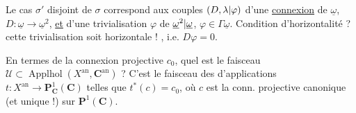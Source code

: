 Le cas $\sigma'$ disjoint de $\sigma$ correspond aux couples $(D,{\lambda|\varphi})$ d'une \uline{connexion} de $\underline\omega$, $D:\underline\omega\longrightarrow\underline\omega^2$, \uline{et} d'une trivialisation $\varphi$ de ${\underline\omega^2|\underline\omega}$, $\varphi\in\Gamma\underline\omega$.
Condition d'horizontalité ?  cette trivialisation soit horizontale !  , i.e. $D\varphi=0$.

En termes de la connexion projective $c_0$, quel est le faisceau $\mathcal U\subset\operatorname{Applhol}(X^{\mathrm{an}},\mathbf C^{\mathrm{an}})$ ? C'est le faisceau des  d'applications  $t:X^{\mathrm{an}}\longrightarrow\mathbf P^1_{\mathbf C}(\mathbf C)$ telles que $t^*(c)=c_0$, où $c$ est la conn. projective canonique (et unique !) sur $\mathbf P^1(\mathbf C)$.

